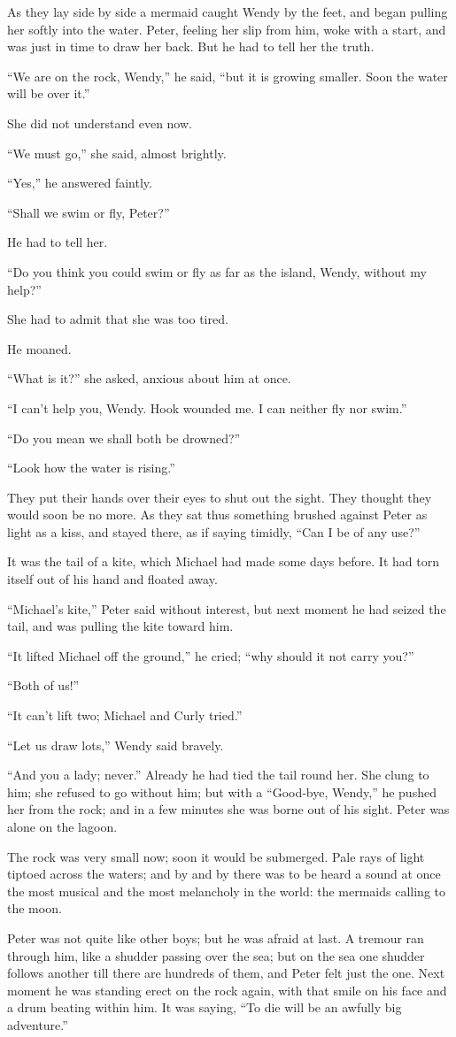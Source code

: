 As they lay side by side a mermaid caught Wendy by the feet, and began pulling her softly into the water.
Peter, feeling her slip from him, woke with a start, and was just in time to draw her back.
But he had to tell her the truth.

“We are on the rock, Wendy,” he said, “but it is growing smaller.
Soon the water will be over it.”

She did not understand even now.

“We must go,” she said, almost brightly.

“Yes,” he answered faintly.

“Shall we swim or fly, Peter?”

He had to tell her.

“Do you think you could swim or fly as far as the island, Wendy, without my help?”

She had to admit that she was too tired.

He moaned.

“What is it?\@” she asked, anxious about him at once.

“I can’t help you, Wendy.
Hook wounded me.
I can neither fly nor swim.”

“Do you mean we shall both be drowned?”

“Look how the water is rising.”

They put their hands over their eyes to shut out the sight.
They thought they would soon be no more.
As they sat thus something brushed against Peter as light as a kiss,
and stayed there, as if saying timidly, “Can I be of any use?”

It was the tail of a kite, which Michael had made some days before.
It had torn itself out of his hand and floated away.

“Michael’s kite,” Peter said without interest,
but next moment he had seized the tail, and was pulling the kite toward him.

“It lifted Michael off the ground,” he cried;
“why should it not carry you?”

“Both of us!”

“It can’t lift two;
Michael and Curly tried.”

“Let us draw lots,” Wendy said bravely.

“And you a lady;
never.”
Already he had tied the tail round her.
She clung to him;
she refused to go without him;
but with a “Good‐bye, Wendy,” he pushed her from the rock;
and in a few minutes she was borne out of his sight.
Peter was alone on the lagoon.

The rock was very small now;
soon it would be submerged.
Pale rays of light tiptoed across the waters;
and by and by there was to be heard a sound at once the most musical and the most melancholy in the world:
the mermaids calling to the moon.

Peter was not quite like other boys;
but he was afraid at last.
A tremour ran through him, like a shudder passing over the sea;
but on the sea one shudder follows another till there are hundreds of them, and Peter felt just the one.
Next moment he was standing erect on the rock again,
with that smile on his face and a drum beating within him.
It was saying, “To die will be an awfully big adventure.”

\endinput
